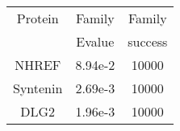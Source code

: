 \documentclass[a4paper,12pt]{article}
\begin{document}
\begin{table}[h]
  \raggedleft{}
  
  \begin{tabular}{ccc}
    
    \toprule
    Protein    & Family & Family \\
               & Evalue & success\\
    \cmidrule{1-3}
    NHREF         & 8.94e-2 & 10000  \\
    Syntenin      & 2.69e-3 & 10000  \\
    DLG2          & 1.96e-3 & 10000  \\

    \bottomrule        
  \end{tabular}   
  \caption{}   
  \label{AMMIB}       
\end{table}


\thispagestyle{empty}
\end{document}
